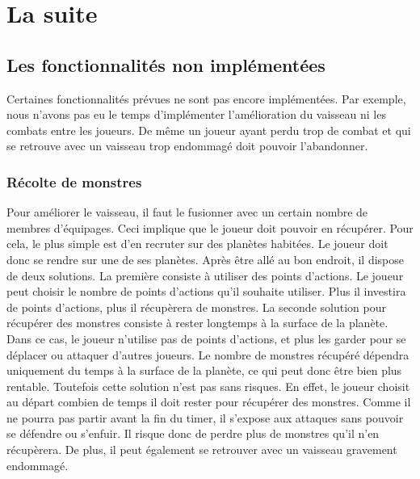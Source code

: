 \documentclass[a4paper,11pt]{report}
\begin{document}
    

\chapter{La suite}

  \section{Les fonctionnalités non implémentées}
    Certaines fonctionnalités prévues ne sont pas encore implémentées. 
    Par exemple, nous n'avons pas eu le temps d'implémenter l'amélioration du vaisseau ni les combats entre les joueurs.
    De même un joueur ayant perdu trop de combat et qui se retrouve avec un vaisseau trop endommagé doit pouvoir l'abandonner.
    
    \subsection{Récolte de monstres}
      Pour améliorer le vaisseau, il faut le fusionner avec un certain nombre de membres d'équipages. Ceci implique que le joueur doit pouvoir en récupérer.
      Pour cela, le plus simple est d'en recruter sur des planètes habitées. Le joueur doit donc se rendre sur une de ses planètes.
      Après être allé au bon endroit, il dispose de deux solutions.
      La première consiste à utiliser des points d'actions. Le joueur peut choisir le nombre de points d'actions qu'il souhaite utiliser.
      Plus il investira de points d'actions, plus il récupèrera de monstres.
      \newline
      La seconde solution pour récupérer des monstres consiste à rester longtemps à la surface de la planète. Dans ce cas, le joueur n'utilise pas de points d'actions, et plus les garder pour se déplacer ou attaquer d'autres joueurs.
      Le nombre de monstres récupéré dépendra uniquement du temps à la surface de la planète, ce qui peut donc être bien plus rentable.
      Toutefois cette solution n'est pas sans risques. En effet, le joueur choisit au départ combien de temps il doit rester pour récupérer des monstres.
      Comme il ne pourra pas partir avant la fin du timer, il s'expose aux attaques sans pouvoir se défendre ou s'enfuir. Il risque donc de perdre plus de monstres qu'il n'en récupèrera.
      De plus, il peut également se retrouver avec un vaisseau gravement endommagé.
    
\end{document}
